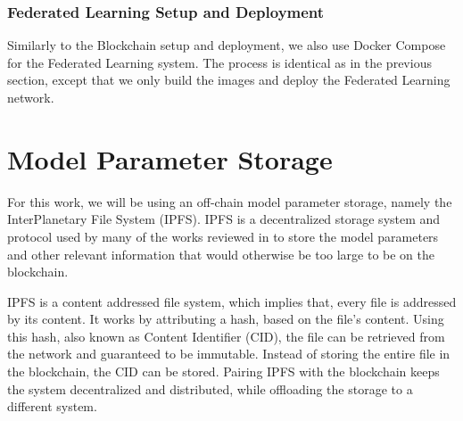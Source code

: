 \subsubsection{Federated Learning Setup and Deployment}

Similarly to the Blockchain setup and deployment, we also use Docker Compose for the Federated Learning system. The process is identical as in the previous section, except that we only build the images and deploy the Federated Learning network.

\section{Model Parameter Storage}\label{background:ipfs}

For this work, we will be using an off-chain model parameter storage, namely the InterPlanetary File System (IPFS). IPFS \cite{10.48550/arxiv.1407.3561} is a decentralized storage system and protocol used by many of the works reviewed in  to store the model parameters and other relevant information that would otherwise be too large to be on the blockchain.

IPFS is a content addressed file system, which implies that, every file is addressed by its content. It works by attributing a hash, based on the file's content. Using this hash, also known as Content Identifier (CID), the file can be retrieved from the network and guaranteed to be immutable. Instead of storing the entire file in the blockchain, the CID can be stored. Pairing IPFS with the blockchain keeps the system decentralized and distributed, while offloading the storage to a different system.